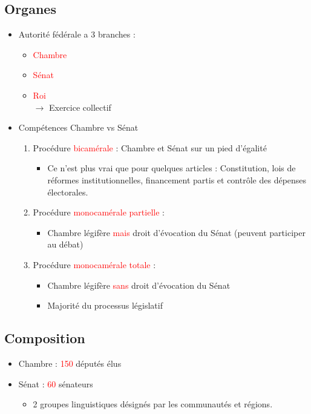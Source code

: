 \subsection{Organes}
\begin{itemize}
	\item Autorité fédérale a 3 branches :
	\begin{itemize}
		\item \textcolor{red}{Chambre}
		\item \textcolor{red}{Sénat}
		\item \textcolor{red}{Roi}\\
		$\rightarrow$ Exercice collectif
	\end{itemize}
	\item Compétences Chambre vs Sénat
	\begin{enumerate}
		\item Procédure \textcolor{red}{bicamérale} : Chambre et Sénat sur un pied d'égalité
		\begin{itemize}
			\item Ce n'est plus vrai que pour quelques articles : Constitution, lois de réformes institutionnelles, financement partis et contrôle des dépenses électorales.
		\end{itemize}
		\item Procédure \textcolor{red}{monocamérale partielle} :
		\begin{itemize}
			\item Chambre légifère \textcolor{red}{mais} droit d'évocation du Sénat (peuvent participer au débat)
		\end{itemize}
		\item Procédure \textcolor{red}{monocamérale totale} :
		\begin{itemize}
			\item Chambre légifère \textcolor{red}{sans} droit d'évocation du Sénat
			\item Majorité du processus législatif
		\end{itemize}
	\end{enumerate}
\end{itemize}

\subsection{Composition}
\begin{itemize}
	\item Chambre : \textcolor{red}{150} députés élus
	\item Sénat : \textcolor{red}{60} sénateurs
	\begin{itemize}
		\item 2 groupes linguistiques désignés par les communautés et régions.
	\end{itemize}
\end{itemize}

